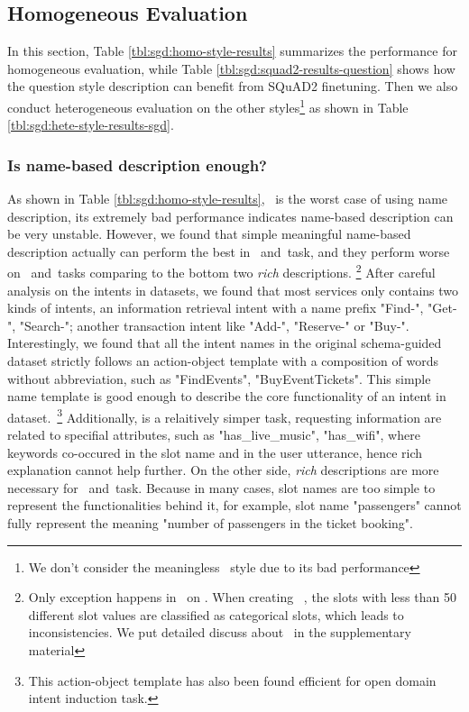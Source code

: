\subsection{Homogeneous Evaluation}
\label{ssec:sgd:homo-eval}
In this section, Table \ref{tbl:sgd:homo-style-results} summarizes the
performance for homogeneous evaluation, while Table
\ref{tbl:sgd:squad2-results-question} shows how the question style
description can benefit from SQuAD2 finetuning. Then we also conduct
heterogeneous evaluation on the other styles\footnote{We don't
  consider the meaningless \ID~style due to its bad performance} as
shown in Table \ref{tbl:sgd:hete-style-results-sgd}.
%
\subsubsection{Is name-based description enough?}
\label{sssec:sgd:question-name}
As shown in Table \ref{tbl:sgd:homo-style-results}, \ID~is the worst
case of using name description, its extremely bad performance
indicates name-based description can be very unstable. However, we
found that simple meaningful name-based description actually can
perform the best in \IC~and~\RSI task, and they perform worse on
\CSL~and~\NSL tasks comparing to the bottom two {\it rich}
descriptions. \footnote{Only exception happens in \CSL~on
  \multiwoz. When creating \multiwoz~\cite{zang-etal-2020-multiwoz},
  the slots with less than 50 different slot values are classified as
  categorical slots, which leads to inconsistencies. We put detailed
  discuss about \multiwoz~in the supplementary material} After careful
analysis on the intents in \sgdst datasets, we found that most
services only contains two kinds of intents, an information retrieval
intent with a name prefix "Find-", "Get-", "Search-"; another
transaction intent like "Add-", "Reserve-" or "Buy-". Interestingly,
we found that all the intent names in the original schema-guided
dataset strictly follows an action-object template with a composition
of words without abbreviation, such as "FindEvents",
"BuyEventTickets". This simple name template is good enough to
describe the core functionality of an intent in \sgdst
dataset.~\footnote{This action-object template has also been found
  efficient for open domain intent induction
  task\cite[e.g.,][OPINE]{vedula2020open}.} Additionally, \RSI is a
relaitively simper task, requesting information are related to
specifial attributes, such as "has\_live\_music", "has\_wifi", where
keywords co-occured in the slot name and in the user utterance, hence
rich explanation cannot help further. On the other side, {\it rich}
descriptions are more necessary for \CSL~and~\NSL task. Because in
many cases, slot names are too simple to represent the functionalities
behind it, for example, slot name "passengers" cannot fully represent
the meaning "number of passengers in the ticket booking".

